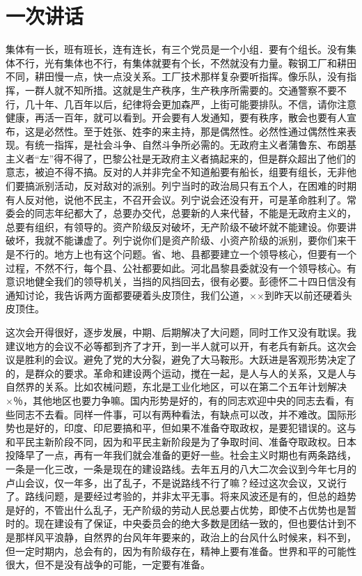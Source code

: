 \section[一次讲话（一九五九年八月十七日）]{一次讲话}


集体有一长，班有班长，连有连长，有三个党员是一个小组．要有个组长。没有集体不行，光有集体也不行，有集体就要有个长，不然就没有力量。鞍钢工厂和耕田不同，耕田慢一点，快一点没关系。工厂技术那样复杂要听指挥。像乐队，没有指挥，一群人就不知所措。这就是生产秩序，生产秩序所需要的。交通警察不要不行，几十年、几百年以后，纪律将会更加森严，上街可能要排队。不信，请你注意健康，再活一百年，就可以看到。开会要有人发通知，要有秩序，散会也要有人宣布，这是必然性。至于姓张、姓李的来主持，那是偶然性。必然性通过偶然性来表现。有统一指挥，是社会斗争、自然斗争所必需的。无政府主义者蒲鲁东、布朗基主义者“左”得不得了，巴黎公社是无政府主义者搞起来的，但是群众超出了他们的意志，被迫不得不搞。反对的人并非完全不知道船要有船长，组要有组长，无非他们要搞派别活动，反对敌对的派别。列宁当时的政治局只有五个人，在困难的时期有人反对他，说他不民主，不召开会议。列宁说会还没有开，可是革命胜利了。常委会的同志年纪都大了，总要办交代，总要新的人来代替，不能是无政府主义的，总要有组织，有领导的。资产阶级反对破坏，无产阶级不破坏就不能建设。你要讲破坏，我就不能谦虚了。列宁说你们是资产阶级、小资产阶级的派别，要你们来干是不行的。地方上也有这个问题。省、地、县都要建立一个领导核心，但要有一个过程，不然不行，每个县、公社都要如此。河北昌黎县委就没有一个领导核心。有意识地健全我们的领导机关，当挡的风挡回去，很有必要。彭德怀二十四日信没有通知讨论，我告诉两方面都要硬着头皮顶住，我们公道，××到昨天以前还硬着头皮顶住。

这次会开得很好，逐步发展，中期、后期解决了大问题，同时工作又没有耽误。我建议地方的会议不必等都到齐了才开，到一半人就可以开，有老兵有新兵。这次会议是胜利的会议。避免了党的大分裂，避免了大马鞍形。大跃进是客观形势决定了的，是群众的要求。革命和建设两个运动，搅在一起，是人与人的关系，又是人与自然界的关系。比如农械问题，东北是工业化地区，可以在第二个五年计划解决×％，其他地区也要力争嘛。国内形势是好的，有的同志欢迎中央的同志去看，有些同志不去看。同样一件事，可以有两种看法，有缺点可以改，并不难改。国际形势也是好的，印度、印尼要搞和平，但如果不准备夺取政权，是要犯错误的。这与和平民主新阶段不同，因为和平民主新阶段是为了争取时间、准备夺取政权。日本投降早了一点，再有一年我们就会准备的更好一些。社会主义时期也有两条路线，一条是一化三改，一条是现在的建设路线。去年五月的八大二次会议到今年七月的卢山会议，仅一年多，出了乱子，不是说路线不行了嘛？经过这次会议，又说行了。路线问题，是要经过考验的，并非太平无事。将来风波还是有的，但总的趋势是好的，不管出什么乱子，无产阶级的劳动人民总要占优势，即使不占优势也是暂时的。现在建设有了保证，中央委员会的绝大多数是团结一致的，但也要估计到不是那样风平浪静，自然界的台风年年要来的，政治上的台风什么时候来，料不到，但一定时期内，总会有的，因为有阶级存在，精神上要有准备。世界和平的可能性很大，但不是没有战争的可能，一定要有准备。


